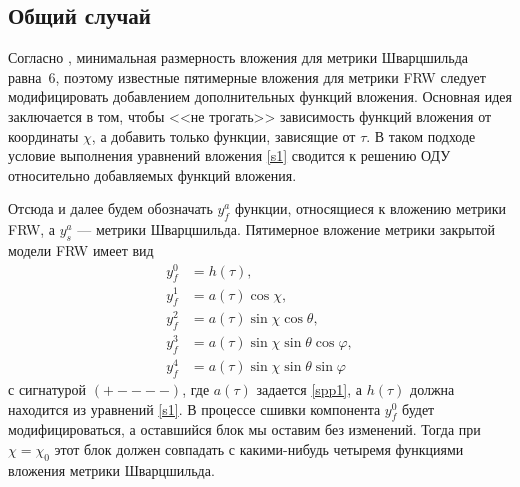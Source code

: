 \documentclass[12pt]{article}
\begin{document}
\subsection{Общий случай}      %
Согласно \cite{kasner2}, минимальная размерность вложения для метрики Шварцшильда равна~$6$, поэтому известные пятимерные вложения для метрики FRW
\cite{robertson1933,rosen65} следует модифицировать добавлением дополнительных функций вложения. Основная идея заключается в том, чтобы <<не трогать>> зависимость функций вложения от координаты $\chi$, а добавить только функции, зависящие от $\tau$. В таком подходе условие выполнения уравнений вложения \eqref{s1} сводится к решению ОДУ относительно добавляемых функций вложения.

Отсюда и далее будем обозначать $y^a_f$ функции, относящиеся к вложению метрики FRW, а $y^a_s$ --- метрики Шварцшильда.
Пятимерное вложение метрики закрытой модели FRW имеет вид
\begin{align}
\label{sp13}	y^0_f &= h(\tau), \\
\label{0}	y^1_f &= a(\tau) \cos{\chi}, \\
\label{1}	y^2_f &= a(\tau) \sin{\chi} \cos{\theta}, \\
\label{2}	y^3_f &= a(\tau) \sin{\chi} \sin{\theta} \cos{\varphi}, \\
\label{3}	y^4_f &= a(\tau) \sin{\chi} \sin{\theta} \sin{\varphi}
\end{align}
с сигнатурой $(+----)$, где $a(\tau)$ задается \eqref{spp1}, а $h(\tau)$ должна находится из уравнений \eqref{s1}.
В процессе сшивки компонента $y^0_f$ будет модифицироваться, а оставшийся блок мы оставим без изменений. Тогда при $\chi = \chi_0$ этот блок должен совпадать с какими-нибудь четыремя функциями вложения метрики Шварцшильда.
\end{document}
